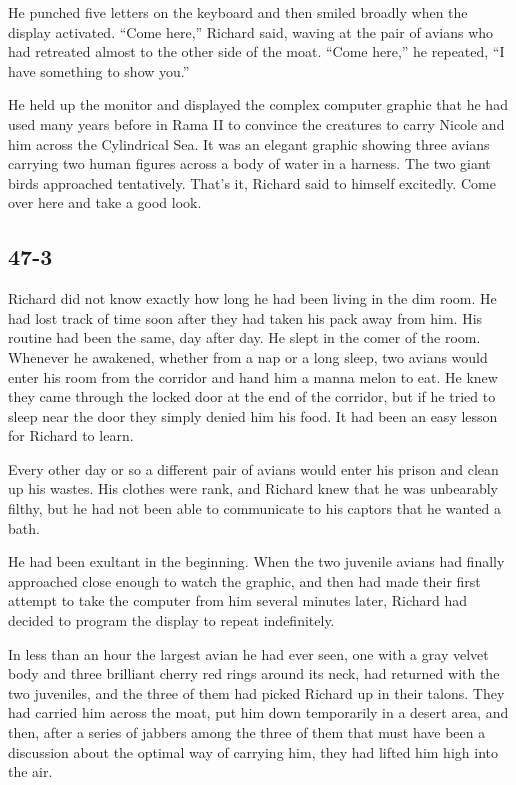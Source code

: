 \documentclass[]{article}
\begin{document}
{He punched five letters on the keyboard and then smiled broadly when the display activated.  “Come here,” Richard said, waving at the pair of avians who had retreated almost to the other side of the moat.  “Come here,” he repeated, “I have something to show you.”

He held up the monitor and displayed the complex computer graphic that he had used many years before in Rama II to convince the creatures to carry Nicole and him across the Cylindrical Sea.  It was an elegant graphic showing three avians carrying two human figures across a body of water in a harness.  The two giant birds approached tentatively.  That’s it, Richard said to himself excitedly.  Come over here and take a good look.


\subsection*{47-3}

Richard did not know exactly how long he had been living in the dim room.  He had lost track of time soon after they had taken his pack away from him.  His routine had been the same, day after day.  He slept in the comer of the room.  Whenever he awakened, whether from a nap or a long sleep, two avians would enter his room from the corridor and hand him a manna melon to eat.  He knew they came through the locked door at the end of the corridor, but if he tried to sleep near the door they simply denied him his food.  It had been an easy lesson for Richard to learn.

Every other day or so a different pair of avians would enter his prison and clean up his wastes.  His clothes were rank, and Richard knew that he was unbearably filthy, but he had not been able to communicate to his captors that he wanted a bath.

He had been exultant in the beginning.  When the two juvenile avians had finally approached close enough to watch the graphic, and then had made their first attempt to take the computer from him several minutes later, Richard had decided to program the display to repeat indefinitely.

In less than an hour the largest avian he had ever seen, one with a gray velvet body and three brilliant cherry red rings around its neck, had returned with the two juveniles, and the three of them had picked Richard up in their talons.  They had carried him across the moat, put him down temporarily in a desert area, and then, after a series of jabbers among the three of them that must have been a discussion about the optimal way of carrying him, they had lifted him high into the air.

}
\end{document}
